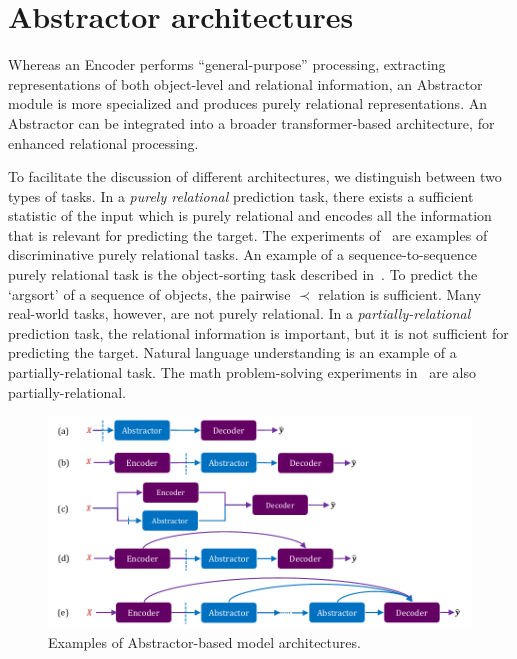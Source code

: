 \section{Abstractor architectures}\label{sec:abstractor_architectures}


Whereas an Encoder performs ``general-purpose'' processing, extracting representations of both object-level and relational information, an Abstractor module is more specialized and produces purely relational representations. An Abstractor can be integrated into a broader transformer-based architecture, for enhanced relational processing.

To facilitate the discussion of different architectures, we distinguish between two types of tasks. In a \textit{purely relational} prediction task, there exists a sufficient statistic of the input which is purely relational and encodes all the information that is relevant for predicting the target. The experiments of~\citep{esbn,kerg2022neural} are examples of discriminative purely relational tasks. An example of a sequence-to-sequence purely relational task is the object-sorting task described in~. To predict the `argsort' of a sequence of objects, the pairwise $\prec$ relation is sufficient. Many real-world tasks, however, are not purely relational. In a \textit{partially-relational} prediction task, the relational information is important, but it is not sufficient for predicting the target. Natural language understanding is an example of a partially-relational task. The math problem-solving experiments in~ are also partially-relational.

\begin{figure}
    \centering
    \includegraphics[width=.8\textwidth]{figures/abstractor_architectures.pdf}
    \caption{Examples of Abstractor-based model architectures.}\label{fig:abstractor_architectures}
    \vskip-10pt
\end{figure}


